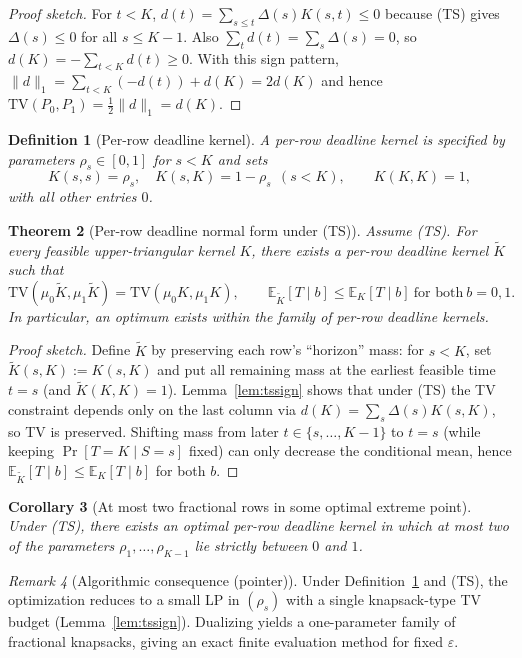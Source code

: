 \documentclass[11pt]{article}
\newtheorem{theorem}{Theorem}
\newtheorem{corollary}[theorem]{Corollary}
\newtheorem{definition}[theorem]{Definition}
\theoremstyle{remark}
\newtheorem{remark}[theorem]{Remark}
\newcommand{\TV}{\mathrm{TV}}
\newcommand{\E}{\mathbb{E}}
\begin{document}
\begin{proof}[Proof sketch]
For $t<K$, $d(t)=\sum_{s\le t}\Delta(s)K(s,t)\le 0$ because (TS) gives $\Delta(s)\le 0$ for all $s\le K-1$.
Also $\sum_t d(t)=\sum_s \Delta(s)=0$, so $d(K)=-\sum_{t<K}d(t)\ge 0$.
With this sign pattern, $\|d\|_1 = \sum_{t<K}(-d(t))+d(K)=2d(K)$ and hence $\TV(P_0,P_1)=\tfrac12\|d\|_1=d(K)$.
\end{proof}


\begin{definition}[Per-row deadline kernel]\label{def:deadline}
A \emph{per-row deadline} kernel is specified by parameters $\rho_s\in[0,1]$ for $s<K$ and sets
\[
K(s,s)=\rho_s,\quad K(s,K)=1-\rho_s\ \ (s<K),\qquad K(K,K)=1,
\]
with all other entries $0$.
\end{definition}

\begin{theorem}[Per-row deadline normal form under (TS)]\label{thm:deadline}
Assume (TS). For every feasible upper-triangular kernel $K$, there exists a per-row deadline kernel $\widetilde K$ such that
\[
\TV(\mu_0\widetilde K,\mu_1\widetilde K)=\TV(\mu_0 K,\mu_1 K),
\qquad
\E_{\widetilde K}[T\mid b]\le \E_K[T\mid b]\ \text{for both}\ b=0,1.
\]
In particular, an optimum exists within the family of per-row deadline kernels.
\end{theorem}

\begin{proof}[Proof sketch]
Define $\widetilde K$ by preserving each row's ``horizon'' mass: for $s<K$, set $\widetilde K(s,K):=K(s,K)$ and put all remaining mass at the earliest feasible time $t=s$ (and $\widetilde K(K,K)=1$).
Lemma~\ref{lem:tssign} shows that under (TS) the TV constraint depends only on the last column via $d(K)=\sum_s \Delta(s)K(s,K)$, so TV is preserved.
Shifting mass from later $t\in\{s,\dots,K-1\}$ to $t=s$ (while keeping $\Pr[T=K\mid S=s]$ fixed) can only decrease the conditional mean, hence $\E_{\widetilde K}[T\mid b]\le \E_K[T\mid b]$ for both $b$.
\end{proof}


\begin{corollary}[At most two fractional rows in some optimal extreme point]\label{cor:twofrac}
Under (TS), there exists an optimal per-row deadline kernel in which at most two of the parameters $\rho_1,\dots,\rho_{K-1}$ lie strictly between $0$ and $1$.
\end{corollary}

\begin{remark}[Algorithmic consequence (pointer)]
Under Definition~\ref{def:deadline} and (TS), the optimization reduces to a small LP in $(\rho_s)$ with a single knapsack-type TV budget (Lemma~\ref{lem:tssign}).
Dualizing yields a one-parameter family of fractional knapsacks, giving an exact finite evaluation method for fixed $\varepsilon$.
\end{remark}
\end{document}
